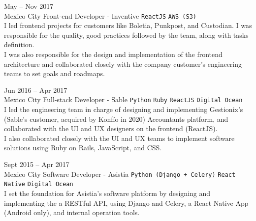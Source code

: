 \documentclass[9pt]{developercv} %
\begin{document}
\begin{entrylist}
    \entry
        {
            May -- Nov 2017
            \\\footnotesize{Mexico City}
        }
        {Front-end Developer - Inventive}
        { 
            \texttt{ReactJS}
            \slashsep\texttt{AWS (S3)}
        }
        {\\
            I led frontend projects for customers like Boletia, Punkpost, and Custodian. I was 
            responsible for the quality, good practices followed by the team, along with tasks 
            definition.\\
            
            I was also responsible for the design and implementation of the frontend architecture
            and collaborated closely with the company customer's engineering teams to set goals and 
            roadmaps.\\
        }

    \entry
        {
            Jun 2016 -- Apr 2017
            \\\footnotesize{Mexico City}
        }
        {Full-stack Developer - Sable}
        {
            \texttt{Python}
            \slashsep\texttt{Ruby}
            \slashsep\texttt{ReactJS}
            \slashsep\texttt{Digital Ocean}
        }
        {\\
            I led the engineering team in charge of designing and implementing Gestionix's 
            (Sable's customer, acquired by Konfío in 2020) Accountants platform, and collaborated with 
            the UI and UX designers on the frontend (ReactJS).\\

            I also collaborated closely with the UI and UX teams to implement software solutions 
            using Ruby on Rails, JavaScript, and CSS.\\
        }

    \entry
        {
            Sept 2015 -- Apr 2017
            \\\footnotesize{Mexico City}
        }
        {Software Developer - Asistia}
        {
            \texttt{Python (Django + Celery)}
            \slashsep\texttt{React Native}
            \slashsep\texttt{Digital Ocean}
        }
        {\\
            I set the foundation for Asistia's software platform by designing and implementing the a 
            RESTful API, using Django and Celery, a React Native App (Android only), and internal 
            operation tools.\\

}
\end{entrylist}
\end{document}
